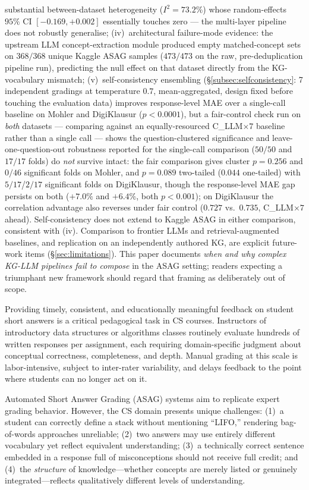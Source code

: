 \documentclass[conference]{IEEEtran}
\begin{document}
substantial between-dataset heterogeneity ($I^2 = 73.2\%$) whose
random-effects $95\%$ CI $[-0.169, +0.002]$ essentially touches zero ---
the multi-layer pipeline does not robustly generalise; (iv)~architectural
failure-mode evidence: the upstream LLM concept-extraction module
produced empty matched-concept sets on $368/368$ unique Kaggle ASAG
samples ($473/473$ on the raw, pre-deduplication pipeline run),
predicting the null effect on that dataset directly from the
KG-vocabulary mismatch; (v)~self-consistency ensembling
(\S\ref{subsec:selfconsistency}: 7 independent gradings at temperature
$0.7$, mean-aggregated, design fixed before touching the evaluation
data) improves response-level MAE over a single-call baseline on
Mohler and DigiKlausur ($p<0.0001$), but a fair-control check run on
\emph{both} datasets --- comparing against an equally-resourced
C\_LLM$\times7$ baseline rather than a single call --- shows the
question-clustered significance and leave-one-question-out robustness
reported for the single-call comparison ($50/50$ and $17/17$ folds) do
\emph{not} survive intact: the fair comparison gives cluster $p=0.256$
and $0/46$ significant folds on Mohler, and $p=0.089$ two-tailed
($0.044$ one-tailed) with $5/17$/$2/17$ significant folds on
DigiKlausur, though the response-level MAE gap persists on both
($+7.0\%$ and $+6.4\%$, both $p<0.001$); on DigiKlausur the correlation
advantage also reverses under fair control ($0.727$ vs.\ $0.735$,
C\_LLM$\times7$ ahead). Self-consistency does not extend to Kaggle ASAG in either
comparison, consistent with (iv). Comparison to frontier LLMs and
retrieval-augmented baselines, and replication on an independently
authored KG, are explicit future-work items (\S\ref{sec:limitations}).
This paper documents \emph{when and why complex KG-LLM pipelines fail
to compose} in the ASAG setting; readers expecting a triumphant new
framework should regard that framing as deliberately out of scope.

Providing timely, consistent, and educationally meaningful feedback on student
short answers is a critical pedagogical task in CS courses. Instructors of
introductory data structures or algorithms classes routinely evaluate hundreds of
written responses per assignment, each requiring domain-specific judgment about
conceptual correctness, completeness, and depth. Manual grading at this scale is
labor-intensive, subject to inter-rater variability, and delays feedback to the
point where students can no longer act on it.

Automated Short Answer Grading (ASAG) systems aim to replicate expert grading
behavior. However, the CS domain presents unique challenges: (1)~a student can
correctly define a stack without mentioning ``LIFO,'' rendering bag-of-words
approaches unreliable; (2)~two answers may use entirely different vocabulary yet
reflect equivalent understanding; (3)~a technically correct sentence embedded in a
response full of misconceptions should not receive full credit; and (4)~the
\emph{structure} of knowledge—whether concepts are merely listed or genuinely
integrated—reflects qualitatively different levels of understanding.
\end{document}
